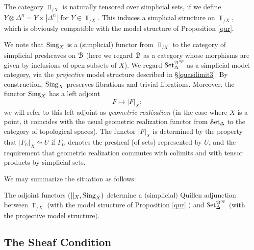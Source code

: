 The category $\Top_{/X}$ is naturally tensored over simplicial sets, if we define $Y \otimes \Delta^n = Y \times |\Delta^n|$ for $Y \in \Top_{/X}$. This induces a simplicial structure on $\Top_{/X}$, which is obviously compatible with the model structure of Proposition \ref{qur}.

We note that $\operatorname{Sing}_X$ is a (simplicial) functor from $\Top_{/X}$ to the category of simplicial presheaves on $\operatorname{\mathcal{B}}$ (here we regard $\operatorname{\mathcal{B}}$ as a category whose morphisms are given by inclusions of open subsets of $X$). We regard $\operatorname{\mathcal{S}et}_{\Delta}^{\operatorname{\mathcal{B}}^{op}}$ as a simplicial model category, via the {\it projective} model structure described in \S \ref{quasilimit3}.
By construction, $\operatorname{Sing}_X$ preserves fibrations and trivial fibrations. Moreover, the functor $\operatorname{Sing}_X$ has a left adjoint $$ F \mapsto |F|_{X};$$
we will refer to this left adjoint as {\it geometric realization} (in the case where $X$ is a point, it coincides with the usual geometric realization functor from $\operatorname{\mathcal{S}et_{\Delta}}$ to the category of topological spaces).
The functor $|F|_{X}$ is determined by the property that $|F_U|_{X} \simeq U$ if $F_U$ denotes the presheaf (of sets) represented by $U$, and the requirement that geometric realization commutes with colimits and with tensor products by simplicial sets.

We may summarize the situation as follows:

\begin{proposition}\label{exquill}
The adjoint functors $(||_{X}, \operatorname{Sing}_X)$ determine a $($simplicial$)$ Quillen adjunction between
$\Top_{/X}$ $($with the model structure of Proposition \ref{qur} $)$ and $\operatorname{\mathcal{S}et}_{\Delta}^{\operatorname{\mathcal{B}}^{op}}$ $($with the projective model structure$)$.
\end{proposition}

\subsection{The Sheaf Condition}\label{para2}

